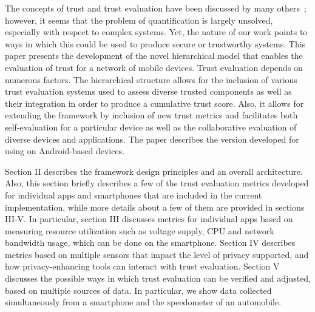 The concepts of trust and trust evaluation have been discussed by many others~\cite{jing2014riskmon,shabtai2010google,zheng2014droidray}; 
however, it seems that the problem  of quantification is largely unsolved, especially with respect to complex systems.
 Yet, the nature of our work points to ways in which 
this could be used to produce secure or trustworthy systems.  
This paper presents the development of the novel hierarchical model that enables the  evaluation of trust for a network of 
mobile devices. Trust evaluation depends on numerous factors. The hierarchical structure allows for the
inclusion of various trust evaluation systems used to assess diverse trusted components as well as their integration in 
order to produce a cumulative trust score. Also, it allows for extending the framework by inclusion of new trust metrics
and facilitates both self-evaluation for a particular device as well as the collaborative evaluation of diverse devices 
and applications. 
The paper describes the version developed for using on Android-based devices.

Section II describes the framework design principles and an overall architecture. Also, this section 
 briefly describes a few of the trust evaluation metrics developed for individual apps and
smartphones that are included in the current implementation,
while more details about a few of them are provided in sections III-V. In particular, section III discusses metrics 
for individual apps based on measuring resource utilization such as voltage supply, CPU and network bandwidth usage,
which can be done on the smartphone.
Section IV describes metrics based on multiple sensors that impact the level of privacy supported, and how 
privacy-enhancing tools can interact with trust evaluation.
Section V discusses the possible ways in which trust evaluation can be verified and adjusted, based on multiple sources
of data.  In particular, we show data collected simultaneously from a smartphone and the speedometer of an 
automobile.
